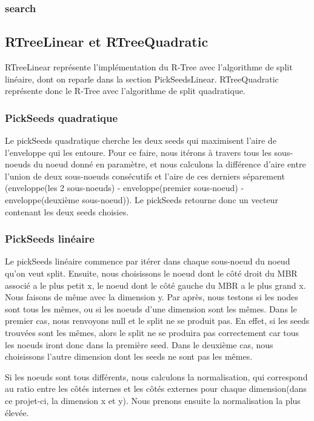 \documentclass[utf8]{article}
\begin{document}
\begin{large}
  \par
  \subsubsection{search}
  \indent
  \par


  \par
  \subsection{RTreeLinear et RTreeQuadratic}\label{RTreeLinear}
  \indent
  \par
  RTreeLinear représente l'implémentation du R-Tree avec l'algorithme de split
  linéaire, dont on reparle dans la section PickSeedsLinear. RTreeQuadratic
  représente donc le R-Tree avec l'algorithme de split quadratique.
  \par

  \subsubsection{PickSeeds quadratique}\label{PickSeeds quadratique}
  \indent
  \par
  Le pickSeeds quadratique cherche les deux seeds qui maximisent l'aire de l'enveloppe qui les entoure.
  \newline Pour ce faire, nous itérons à travers tous les sous-noeuds du noeud donné en paramètre,
  et nous calculons la différence d'aire entre l'union de deux sous-noeuds consécutifs et l'aire de
  ces derniers séparement (enveloppe(les 2 sous-noeuds) - enveloppe(premier sous-noeud) - enveloppe(deuxième sous-noeud)).
  \newline Le pickSeeds retourne donc un vecteur contenant les deux seeds choisies.
  \par
  \subsubsection{PickSeeds linéaire}\label{PickSeeds lineaire}
  \indent
  \par
  Le pickSeeds linéaire commence par itérer dans chaque sous-noeud du noeud
  qu'on veut split. Ensuite, nous choisissons le noeud dont le côté droit du MBR
  associé a le plus petit x, le noeud dont le côté gauche du MBR a le plus grand
  x. Nous faisons de même avec la dimension y. Par après, nous testons si les
  nodes sont tous les mêmes, ou si les noeuds d'une dimension sont les mêmes.
  Dans le premier cas, nous renvoyons null et le split ne se produit pas. En
  effet, si les seeds trouvées sont les mêmes, alors le split ne se produira pas
  correctement car tous les noeuds iront donc dans la première seed. Dans le
  deuxième cas, nous choisissons l'autre dimension dont les seeds ne sont pas
  les mêmes.
  \par
  \indent
  \par
  Si les noeuds sont tous différents, nous calculons la normalisation, qui
  correspond au ratio entre les côtés internes et les côtés externes pour chaque
  dimension(dans ce projet-ci, la dimension x et y). Nous prenons ensuite la
  normalisation la plus élevée.
  \par


\end{large}
\end{document}

